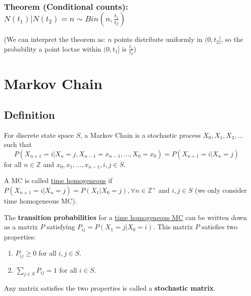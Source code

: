 \documentclass[11pt]{elegantbook}
\begin{document}
\subsection{Theorem (Conditional counts): $N(t_1)|N(t_2)=n\sim Bin(n,\frac{t_1}{t_2})$}
(We can interpret the theorem as: $n$ points distribute uniformly in $(0,t_2]$, so the probability a point loctae within $(0,t_1]$ is $\frac{t_1}{t_2}$)
















































\chapter{Markov Chain}
\section{Definition}
For discrete state space $S$, a Markov Chain is a stochastic process $X_0,X_1,X_2,...$ such that
$$P(X_{n+1}=i|X_n=j,X_{n-1}=x_{n-1},...,X_0=x_0)=P(X_{n+1}=i|X_n=j)$$
for all $n\in \mathbb{Z}$ and $x_0,x_1,...,x_{n-1},i,j\in S$.

A MC is called \underline{time homogeneous} if $P(X_{n+1}=i|X_n=j)=P(X_1|X_0=j),\forall n\in \mathbb{Z}^+$ and $i,j\in S$ (we only consider time homogeneous MC).

The \textbf{transition probabilities} for a \underline{time homogeneous MC} can be written down as a matrix $P$ satisfying $P_{ij} = P (X_1 = j|X_0 = i)$. This matrix $P$ satisfies two properties:
\begin{enumerate}[(1)]
    \item $P_{ij}\geq 0$ for all $i,j\in S$.
    \item $\sum_{j\in S}P_{ij}=1$ for all $i\in S$.
\end{enumerate}
Any matrix satisfies the two properties is called a \textbf{stochastic matrix}.
\end{document}
